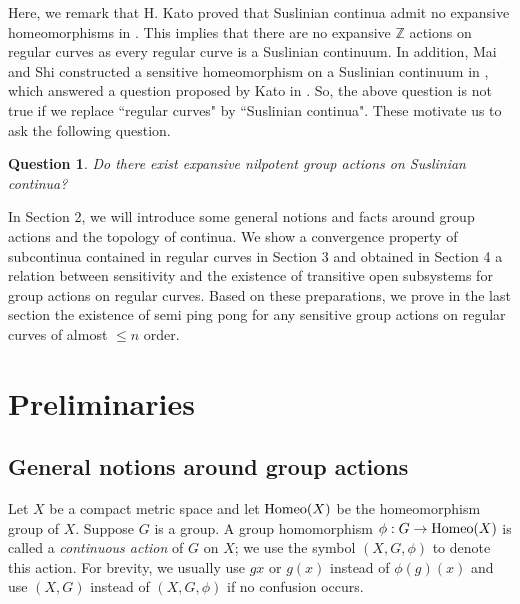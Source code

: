 \documentclass[12pt,a4paper]{amsart}
\newtheorem{ques}[thm]{Question}
\theoremstyle{definition}
\numberwithin{equation}{section}
\begin{document}
Here, we remark that  H. Kato proved that Suslinian continua admit no expansive homeomorphisms in \cite{Ka90}. This  implies that there are no expansive $\mathbb{Z}$ actions on regular curves as every regular curve is a Suslinian continuum. In addition, Mai and Shi constructed a sensitive homeomorphism on a Suslinian continuum in \cite{MS072}, which answered a
question proposed by Kato in \cite{Ka93}. So, the above question is not true if we replace ``regular curves" by ``Suslinian continua".
These motivate us to ask the following question.


\begin{ques}\label{question2}
Do there exist expansive nilpotent group actions on Suslinian continua?
\end{ques}


In Section 2, we will introduce some general notions and facts around group actions and the topology of continua.
We show a convergence property of subcontinua contained in regular curves in Section 3 and obtained in Section 4 a relation between
sensitivity and the existence of transitive open subsystems for group actions on regular curves. Based on these preparations,
we prove in the last section the existence of semi ping pong for any sensitive group actions on regular curves of almost
$\leq n$ order.




\section{Preliminaries}




\subsection{General notions around group actions}

Let $X$ be a compact metric space and let ${\rm Homeo}(X)$ be
the homeomorphism group of $X$. Suppose $G$ is a group. A group
homomorphism $\phi: G\rightarrow {\rm Homeo}(X)$ is called a {\it continuous
action} of $G$ on $X$; we use the symbol $(X, G, \phi)$ to denote this action.
 For brevity, we usually use $gx$ or $g(x)$ instead of $\phi(g)(x)$
and use $(X, G)$ instead of $(X, G, \phi)$ if no confusion occurs.
\end{document}
